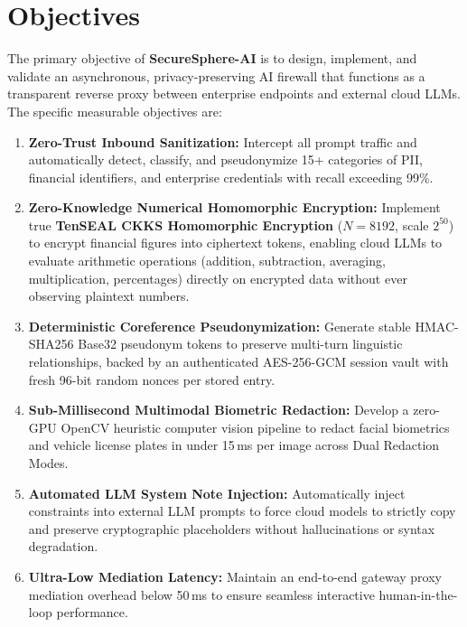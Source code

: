\documentclass[12pt,a4paper,oneside]{report}
\numberwithin{equation}{chapter}
\begin{document}
\section{Objectives}
The primary objective of \textbf{SecureSphere-AI} is to design, implement, and validate an asynchronous, privacy-preserving AI firewall that functions as a transparent reverse proxy between enterprise endpoints and external cloud LLMs. The specific measurable objectives are:
\begin{enumerate}[leftmargin=*]
    \item \textbf{Zero-Trust Inbound Sanitization:} Intercept all prompt traffic and automatically detect, classify, and pseudonymize 15+ categories of PII, financial identifiers, and enterprise credentials with recall exceeding 99\%.
    \item \textbf{Zero-Knowledge Numerical Homomorphic Encryption:} Implement true \textbf{TenSEAL CKKS Homomorphic Encryption} ($N=8192$, scale $2^{50}$) to encrypt financial figures into ciphertext tokens, enabling cloud LLMs to evaluate arithmetic operations (addition, subtraction, averaging, multiplication, percentages) directly on encrypted data without ever observing plaintext numbers.
    \item \textbf{Deterministic Coreference Pseudonymization:} Generate stable HMAC-SHA256 Base32 pseudonym tokens to preserve multi-turn linguistic relationships, backed by an authenticated AES-256-GCM session vault with fresh 96-bit random nonces per stored entry.
    \item \textbf{Sub-Millisecond Multimodal Biometric Redaction:} Develop a zero-GPU OpenCV heuristic computer vision pipeline to redact facial biometrics and vehicle license plates in under 15\,ms per image across Dual Redaction Modes.
    \item \textbf{Automated LLM System Note Injection:} Automatically inject constraints into external LLM prompts to force cloud models to strictly copy and preserve cryptographic placeholders without hallucinations or syntax degradation.
    \item \textbf{Ultra-Low Mediation Latency:} Maintain an end-to-end gateway proxy mediation overhead below 50\,ms to ensure seamless interactive human-in-the-loop performance.
\end{enumerate}
\end{document}

